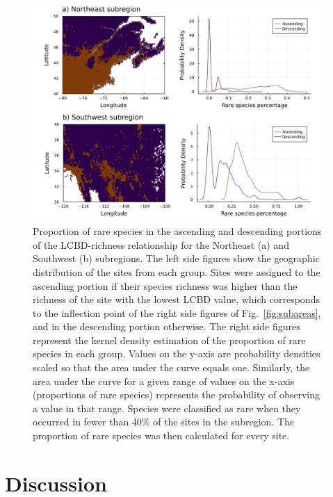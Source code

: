 \documentclass[10pt,oneside]{article}
\makeatletter
\def\maxwidth{\ifdim\Gin@nat@width>\linewidth\linewidth
\else\Gin@nat@width\fi}
\let\Oldincludegraphics\includegraphics
\renewcommand{\includegraphics}[1]{\Oldincludegraphics[width=\maxwidth]{#1}}
\makeatother
\begin{document}
\begin{figure}
\hypertarget{fig:rarespecies}{%
\centering
\includegraphics{figures/rare-species.png}
\caption{Proportion of rare species in the ascending and descending
portions of the LCBD-richness relationship for the Northeast (a) and
Southwest (b) subregions. The left side figures show the geographic
distribution of the sites from each group. Sites were assigned to the
ascending portion if their species richness was higher than the richness
of the site with the lowest LCBD value, which corresponds to the
inflection point of the right side figures of Fig.~\ref{fig:subareas},
and in the descending portion otherwise. The right side figures
represent the kernel density estimation of the proportion of rare
species in each group. Values on the y-axis are probability densities
scaled so that the area under the curve equals one. Similarly, the area
under the curve for a given range of values on the x-axis (proportions
of rare species) represents the probability of observing a value in that
range. Species were classified as rare when they occurred in fewer than
40\% of the sites in the subregion. The proportion of rare species was
then calculated for every site.}\label{fig:rarespecies}
}
\end{figure}

\hypertarget{discussion}{%
\section{Discussion}\label{discussion}}
\end{document}
